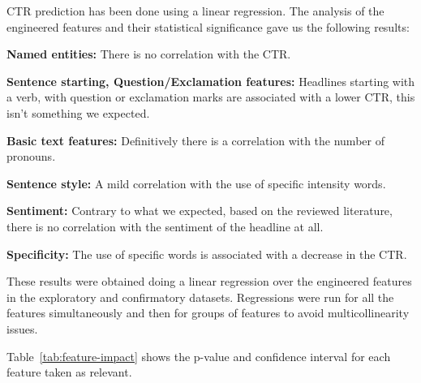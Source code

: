 \documentclass[11pt]{article}
\begin{document}
CTR prediction has been done using a linear regression. The analysis of the engineered features and their statistical significance gave us the following results:

\textbf{Named entities:} There is no correlation with the CTR.

\textbf{Sentence starting, Question/Exclamation features:} Headlines starting with a verb, with question or exclamation marks are associated with a lower CTR, this isn't something we expected.

\textbf{Basic text features:} Definitively there is a correlation with the number of pronouns.

\textbf{Sentence style:} A mild correlation with the use of specific intensity words.

\textbf{Sentiment:} Contrary to what we expected, based on the reviewed literature, there is no correlation with the sentiment of the headline at all.

\textbf{Specificity:} The use of specific words is associated with a decrease in the CTR.

These results were obtained doing a linear regression over the engineered features in the exploratory and confirmatory datasets. Regressions were run for all the features simultaneously and then for groups of features to avoid multicollinearity issues.

Table~\ref{tab:feature-impact} shows the p-value and confidence interval for each feature taken as relevant.
\end{document}
